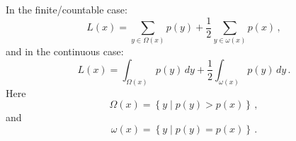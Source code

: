 In the finite/countable case:
\begin{equation}
L(x) = \sum_{y \in \Omega(x)} p(y) + \frac{1}{2} \sum_{y \in \omega (x)} p(x) \,,
\end{equation}
and in the continuous case:
\begin{equation}
L(x) = \int_{\Omega(x)} p(y) \, dy + \frac{1}{2} \int_{\omega(x)} p(y) \, dy \,.
\end{equation}
Here 
\begin{equation}
\Omega(x) = \left\{ y \mid p(y)>p(x) \right\} \,,
\end{equation}
and
\begin{equation}
\omega(x) = \left\{ y \mid p(y)=p(x) \right\} \,.
\end{equation}


